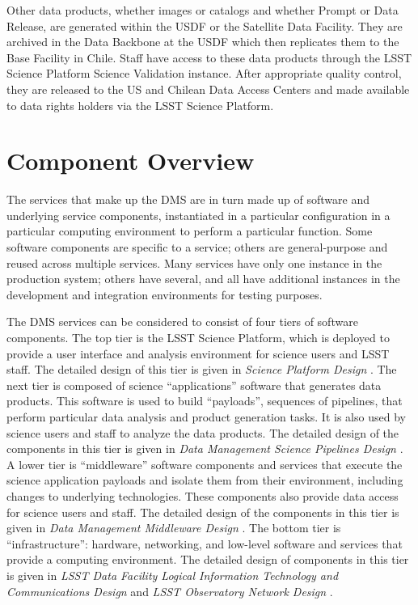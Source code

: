 \documentclass[DM,toc,lsstdraft]{lsstdoc}
\begin{document}
Other data products, whether images or catalogs and whether Prompt or Data Release, are generated within the USDF or the Satellite Data Facility.
They are archived in the Data Backbone at the USDF which then replicates them to the Base Facility in Chile.
Staff have access to these data products through the LSST Science Platform Science Validation instance.
After appropriate quality control, they are released to the US and Chilean Data Access Centers and made available to data rights holders via the LSST Science Platform.




\section{Component Overview}\label{component-overview}

The services that make up the DMS are in turn made up of software and
underlying service components, instantiated in a particular
configuration in a particular computing environment to perform a
particular function. Some software components are specific to a service;
others are general-purpose and reused across multiple services. Many
services have only one instance in the production system; others have
several, and all have additional instances in the development and
integration environments for testing purposes.

The DMS services can be considered to consist of four tiers of software
components. The top tier is the LSST Science Platform, which is deployed
to provide a user
interface and analysis environment for science users and LSST staff. The
detailed design of this tier is given in \textit{Science Platform Design} . The next
tier is composed of science ``applications'' software that generates
data products. This software is used to build ``payloads'', sequences of
pipelines, that perform particular data analysis and product generation
tasks. It is also used by science users and staff to analyze the data
products. The detailed design of the components in this tier is given in
\textit{Data Management Science Pipelines Design} . A lower tier is
``middleware'' software components and services that execute the science
application payloads and isolate them from their environment, including
changes to underlying technologies. These components also provide data
access for science users and staff. The detailed design of the
components in this tier is given in \textit{Data Management Middleware Design} .
The bottom tier is ``infrastructure'': hardware, networking,
and low-level software and services that provide a computing
environment. The detailed design of components in this tier is given in
\textit{LSST Data Facility Logical Information Technology and Communications Design}  and \textit{LSST Observatory Network Design} .
\end{document}
